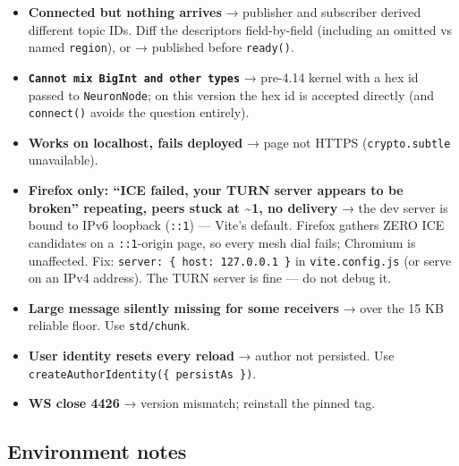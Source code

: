 \documentclass[
  nobib]{tufte-handout}
\providecommand{\tightlist}{%
  \setlength{\itemsep}{0pt}\setlength{\parskip}{0pt}}
\begin{document}
\begin{itemize}
\tightlist
\item
  \textbf{Connected but nothing arrives} → publisher and subscriber
  derived different topic IDs. Diff the descriptors field-by-field
  (including an omitted vs named \texttt{region}), or → published before
  \texttt{ready()}.
\item
  \textbf{\texttt{Cannot\ mix\ BigInt\ and\ other\ types}} → pre-4.14
  kernel with a hex id passed to \texttt{NeuronNode}; on this version
  the hex id is accepted directly (and \texttt{connect()} avoids the
  question entirely).
\item
  \textbf{Works on localhost, fails deployed} → page not HTTPS
  (\texttt{crypto.subtle} unavailable).
\item
  \textbf{Firefox only: ``ICE failed, your TURN server appears to be
  broken'' repeating, peers stuck at \textasciitilde1, no delivery} →
  the dev server is bound to IPv6 loopback (\texttt{::1}) --- Vite's
  default. Firefox gathers ZERO ICE candidates on a \texttt{::1}-origin
  page, so every mesh dial fails; Chromium is unaffected. Fix:
  \texttt{server:\ \{\ host:\ \textquotesingle{}127.0.0.1\textquotesingle{}\ \}}
  in \texttt{vite.config.js} (or serve on an IPv4 address). The TURN
  server is fine --- do not debug it.
\item
  \textbf{Large message silently missing for some receivers} → over the
  15 KB reliable floor. Use \texttt{std/chunk}.
\item
  \textbf{User identity resets every reload} → author not persisted. Use
  \texttt{createAuthorIdentity(\{\ persistAs\ \})}.
\item
  \textbf{WS close 4426} → version mismatch; reinstall the pinned tag.
\end{itemize}

\subsection{Environment notes}\label{environment-notes}
\end{document}
